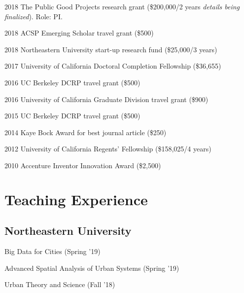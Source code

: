 \documentclass[12pt,letterpaper]{report}
\newcommand{\listitemspace}{0.15em}
\renewenvironment{itemize}
{\begin{list}{}{\setlength{\leftmargin}{0em}
			\setlength{\parskip}{0em}
			\setlength{\itemsep}{\listitemspace}
			\setlength{\parsep}{\listitemspace}}}
	{\end{list}}
\begin{document}
	
	\begin{tablist}
		
		\item[2018] \tab The Public Good Projects research grant (\$200,000/2 years \textit{details being finalized}). Role: PI.
		
		\item[2018] \tab ACSP Emerging Scholar travel grant (\$500)
		
		\item[2018] \tab Northeastern University start-up research fund (\$25,000/3 years)
		
		\item[2017] \tab University of California Doctoral Completion Fellowship (\$36,655)
		
		\item[2016] \tab UC Berkeley DCRP travel grant (\$500)
		
		\item[2016] \tab University of California Graduate Division travel grant (\$900)
		
		\item[2015] \tab UC Berkeley DCRP travel grant (\$500)
		
		\item[2014] \tab Kaye Bock Award for best journal article (\$250)
		
		\item[2012] \tab University of California Regents' Fellowship (\$158,025/4 years)
		
		\item[2010] \tab Accenture Inventor Innovation Award (\$2,500)
		
	\end{tablist}
	
	
	
	\section*{Teaching Experience}
	
	\subsection*{Northeastern University}
	
	\begin{itemize}
		
		\item Big Data for Cities (Spring '19)
		
		\item Advanced Spatial Analysis of Urban Systems (Spring '19)
		
		\item Urban Theory and Science (Fall '18)
		
	\end{itemize}
	
\end{document}
